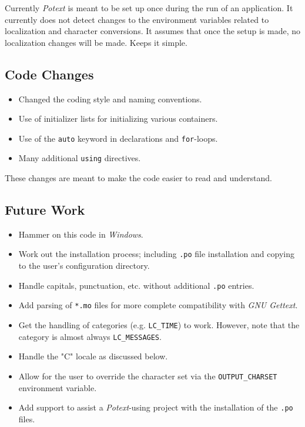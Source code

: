 \documentclass[
 11pt,
 twoside,
 a4paper,
 final                                 %
]{article}
\begin{document}
   Currently \textsl{Potext} is meant to be set up once during
   the run of an application.
   It currently does not detect changes to the environment variables
   related to localization and character conversions.
   It assumes that once the setup is made, no localization changes
   will be made. Keeps it simple.

\subsection{Code Changes}
\label{subsec:introduction_changes}

   \begin{itemize}
      \item Changed the coding style and naming conventions.
      \item Use of initializer lists for initializing various containers.
      \item Use of the \texttt{auto} keyword in declarations and
         \texttt{for}-loops.
      \item Many additional \texttt{using} directives.
   \end{itemize}

   These changes are meant to make the code easier to read and understand.

\subsection{Future Work}
\label{subsec:introduction_future}

   \begin{itemize}
      \item Hammer on this code in \textsl{Windows}.
      \item Work out the installation process; including \texttt{.po} file
         installation and copying to the user's configuration directory.
      \item Handle capitals, punctuation, etc. without additional
         \texttt{.po} entries.
      \item Add parsing of \texttt{*.mo} files for more complete
         compatibility with \textsl{GNU Gettext}.
      \item Get the handling of categories (e.g. \texttt{LC\_TIME}) to
         work. However, note that the category is almost always
         \texttt{LC\_MESSAGES}.
      \item Handle the "C" locale as discussed below.
      \item Allow for the user to override the character set via the
         \texttt{OUTPUT\_CHARSET} environment variable.
      \item Add support to assist a \textsl{Potext}-using project with the
         installation of the \texttt{.po} files.
   \end{itemize}
\end{document}
